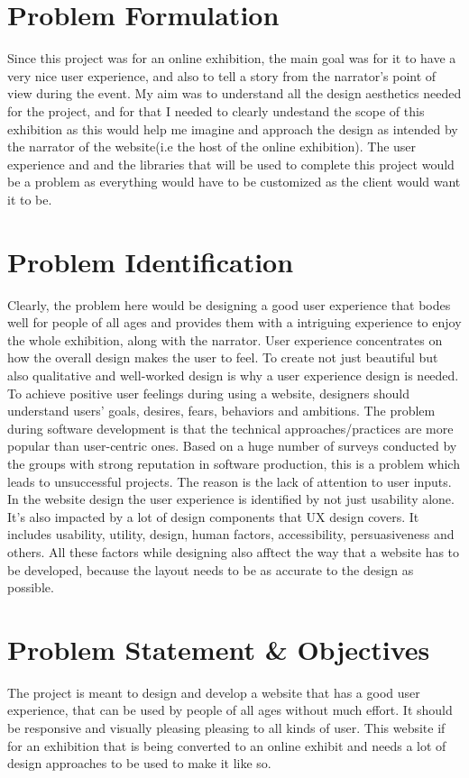 \section{Problem Formulation}
Since this project was for an online exhibition, the main goal was for it to have a very nice user experience, and also to tell a story from the narrator's point of view during the event.
My aim was to understand all the design aesthetics needed for the project, and for that I needed to clearly undestand the scope of this exhibition as this would help me imagine and approach the design as intended by the narrator of the website(i.e the host of the online exhibition).
The user experience and and the libraries that will be used to complete this project would be a problem as everything would have to be customized as the client would want it to be.

\section{Problem Identification}

Clearly, the problem here would be designing a good user experience that bodes well for people of all ages and provides them with a intriguing experience to enjoy the whole exhibition, along with the narrator. User experience concentrates on how the overall design makes the user to feel. To create not just beautiful but also qualitative and well-worked design is why a user experience design is needed. To achieve positive user feelings during using a website, designers should understand users’ goals, desires, fears, behaviors and ambitions. The problem during software development is that the technical approaches/practices are more popular than user-centric ones. Based on a huge number of surveys conducted by the groups with strong reputation in software production, this is a problem which leads to unsuccessful projects. The reason is the lack of attention to user inputs. In the website design the user experience is identified by not just usability alone. It's also impacted by a lot of design components that UX design covers. It includes usability, utility, design, human factors, accessibility, persuasiveness and others. All these factors while designing also afftect the way that a website has to be developed, because the layout needs to be as accurate to the design as possible.


\section{Problem Statement \& Objectives}
The project is meant to design and develop a website that has a good user experience, that can be used by people of all ages without much effort. It should be responsive and visually pleasing pleasing to all kinds of user. 
This website if for an exhibition that is being converted to an online exhibit and needs a lot of design approaches to be used to make it like so.

